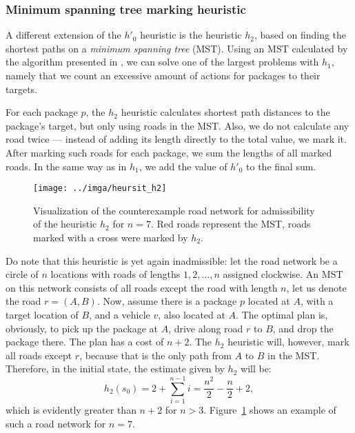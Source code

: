 \subsubsection{Minimum spanning tree marking heuristic}\label{sfa2}

A different extension of the $h'_0$ heuristic
is the heuristic $h_2$, based
on finding the shortest paths on a \textit{minimum spanning tree} (MST).
Using an MST calculated by the algorithm presented in \citet{Kruskal1956}, we can solve one of the largest problems with $h_1$,
namely that we count an excessive amount of \drive{} actions
for packages to their targets.

For each package $p$, the $h_2$ heuristic calculates
shortest path distances to the package's target, but only using roads in the MST.
Also, we do not calculate any road twice --- instead of
adding its length directly to the total value, 
we mark it.
After marking such roads for each package,
we sum the lengths of all marked roads.
In the same way as in $h_1$, we add the value of $h'_0$ to
the final sum.

\begin{figure}[tb]
\centering
\texttt{[image: ../imga/heursit\_h2]}
\caption[Visualization of the counterexample road network for admissibility of the heuristic $h_2$ for $n = 7$.]{Visualization of the counterexample road network for
admissibility of the heuristic $h_2$ for $n = 7$. Red roads represent the MST, roads marked with a cross were marked by $h_2$.}
\label{fig:heursit_h2}
\end{figure}

Do note that this heuristic is yet again inadmissible:
let the road network be a circle of $n$ locations with
roads of lengths $1, 2, \ldots, n$ assigned clockwise.
An MST on this network consists of all roads except the road
with length $n$, let us denote the road $r = (A, B)$.
Now, assume there is a package $p$ located at $A$, with a target
location of $B$, and a vehicle $v$, also located at $A$.
The optimal plan is, obviously, to pick up the package at $A$,
drive along road $r$ to $B$, and drop the package there.
The plan has a cost of $n+2$. The $h_2$ heuristic will, however, mark
all roads except $r$, because that is the only path from $A$ to $B$
in the MST. Therefore, in the initial state, the estimate given by $h_2$ will be:
$$h_2(s_0) = 2 + \sum_{i=1}^{n-1} i = \frac{n^2}{2} - \frac{n}{2} + 2,$$
which is evidently greater than $n+2$ for $n > 3$.
Figure~\ref{fig:heursit_h2} shows an example of such a road network
for $n = 7$.


